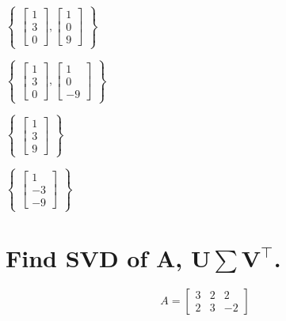 \documentclass{exam}
\begin{document}
\begin{oneparchoices}
  \choice $\begin{Bmatrix}
          \begin{bmatrix}
            1 \\
            3 \\
            0
          \end{bmatrix},
          \begin{bmatrix}
            1 \\
            0 \\
            9
          \end{bmatrix}
          \end{Bmatrix}$

  \choice $\begin{Bmatrix}
          \begin{bmatrix}
            1 \\
            3 \\
            0
          \end{bmatrix},
          \begin{bmatrix}
            1 \\
            0 \\
            -9
          \end{bmatrix}
          \end{Bmatrix}$

  \choice $\begin{Bmatrix} 
          \begin{bmatrix}
            1 \\
            3 \\ 
            9
          \end{bmatrix}
          \end{Bmatrix}$

  \choice $\begin{Bmatrix} 
          \begin{bmatrix}
            1 \\
            -3 \\
            -9
          \end{bmatrix}
          \end{Bmatrix}$
\end{oneparchoices}

\section{Find SVD of A, U$\sum$$\textbf{V}^\intercal$\/.} 
\[
  A=
\left[ {\begin{array}{ccc}
   3 & 2 & 2 \\
   2 & 3 & -2
  \end{array} } \right]
\]
\end{document}
